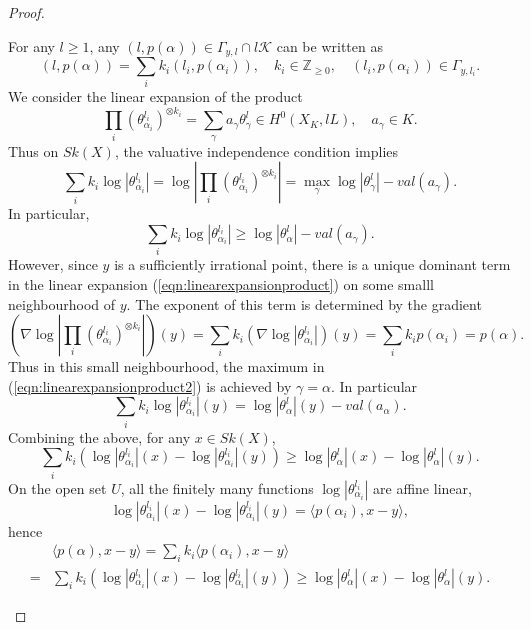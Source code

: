 \documentclass[a4paper]{article}
\theoremstyle{definition}
\newcommand{\Z}{\mathbb{Z}}
\begin{document}
\begin{proof}
\begin{enumerate}
	
	For any $l\geq  1$, any $(l,   p(\alpha))\in \Gamma_{y,l}\cap l \mathcal{K}$ can be written as 
	\[
	(l,  p(\alpha))=  \sum_i k_i ( l_i, p(\alpha_i)),\quad k_i\in \Z_{\geq 0},\quad ( l_i, p(\alpha_i))\in \Gamma_{y,l_i}.
	\]
	We consider the  linear expansion of the product
	\begin{equation}\label{eqn:linearexpansionproduct}
	\prod_i (\theta_{\alpha_i}^{l_i} )^{\otimes k_i}= \sum_\gamma  a_\gamma  \theta_\gamma^l    \in H^0(X_K, lL),\quad a_\gamma\in K.
	\end{equation}
	Thus on $Sk(X)$, the valuative independence condition implies
	\begin{equation}\label{eqn:linearexpansionproduct2}
	\sum_i k_i \log |\theta_{\alpha_i}^{l_i} |=  \log | 	\prod_i (\theta_{\alpha_i}^{l_i} )^{\otimes k_i}|= \max_\gamma \log |\theta_\gamma^l |- val(a_\gamma).
	\end{equation}
	In particular,
	\begin{equation*}
		\sum_i k_i \log |\theta_{\alpha_i}^{l_i} |\geq \log |\theta_\alpha^l |- val(a_\gamma).
	\end{equation*}
	However, since $y$ is a sufficiently irrational point, there is a unique dominant term in the linear expansion (\ref{eqn:linearexpansionproduct}) on some smalll neighbourhood of $y$. The exponent of this term is determined by the gradient
	\[
(\nabla  \log 	|\prod_i (\theta_{\alpha_i}^{l_i} )^{\otimes k_i} |)(y)= \sum_i k_i (\nabla  \log 	| \theta_{\alpha_i}^{l_i} |)(y)=  \sum_i k_i p(\alpha_i)= p(\alpha)  .
	\]
	Thus in this small neighbourhood, the maximum in (\ref{eqn:linearexpansionproduct2}) is achieved by $\gamma=\alpha$. In particular 
	\[
		\sum_i k_i \log |\theta_{\alpha_i}^{l_i} |(y)=  \log |\theta_\alpha^l | (y)- val(a_\alpha).
	\]
		Combining the above, for any $x\in Sk(X)$,
\[
	\sum_i k_i  \left(\log |\theta_{\alpha_i}^{l_i} | (x) -  \log |\theta_{\alpha_i}^{l_i} | (y) \right)  \geq \log |\theta_\alpha^l |(x)- \log |\theta_\alpha^l | (y).
\]
On the open set $U$, all the finitely many functions $\log |\theta_{\alpha_i}^{l_i}|$ are affine linear, 
\[
\log |\theta_{\alpha_i}^{l_i} | (x) -  \log |\theta_{\alpha_i}^{l_i} | (y) = \langle p(\alpha_i), x-y\rangle,
\]
hence
\[
\begin{split}
&  	   \langle p(\alpha), x-y\rangle=  \sum_i k_i  \langle p(\alpha_i), x-y\rangle
	\\
	=& 	\sum_i k_i  \left(\log |\theta_{\alpha_i}^{l_i} | (x) -  \log |\theta_{\alpha_i}^{l_i} | (y) \right)  \geq \log |\theta_\alpha^l |(x)- \log |\theta_\alpha^l | (y).
\end{split}
\]
\end{enumerate}
\end{proof}
\end{document}
